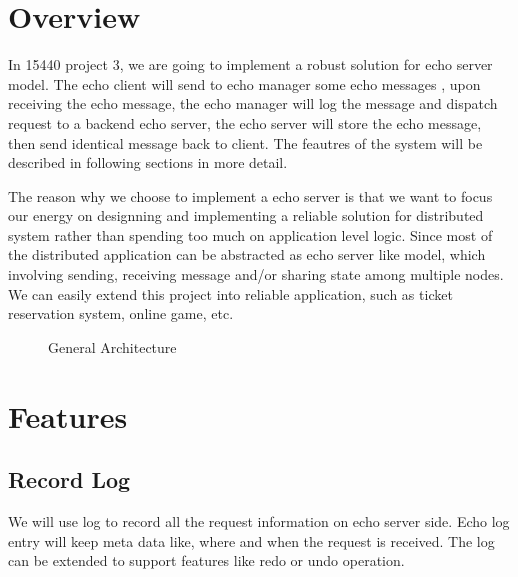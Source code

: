 \documentclass[12pt]{article}
\begin{document}
\pagestyle{headings}
\setcounter{page}{1}

\section{Overview}
In 15440 project 3, we are going to implement a robust solution for
echo server model. The echo client will send to echo manager some echo messages
, upon receiving the echo message, the echo manager will log the message and 
dispatch request to a backend echo server, the echo server will store the echo 
message, then send identical message back to client. The feautres of the 
system will be described in following sections in more detail. 

The reason why we choose to implement a echo server is that
we want to focus our energy on designning and implementing a reliable solution
for distributed system rather than spending too much on application level logic. 
Since most of the distributed
application can be abstracted as echo server like model, which involving
sending, receiving message and/or sharing state among multiple nodes. We 
can easily extend this project into reliable application, such as 
ticket reservation system, online game, etc.

\begin{figure}[H] %
\caption{General Architecture}
\label{fig:speciation}
\end{figure}

\section{Features}
\subsection{Record Log}
We will use log to record all the request information on echo server side. Echo log
entry will keep meta data like, where and when the request is received. The log can
be extended to support features like redo or undo operation.
\end{document}
